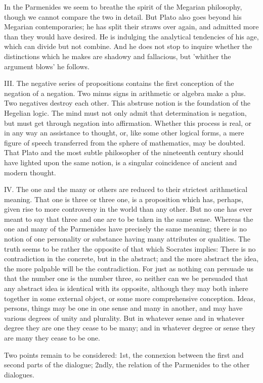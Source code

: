 In the Parmenides we seem to breathe the spirit of the Megarian
philosophy, though we cannot compare the two in detail. But Plato also
goes beyond his Megarian contemporaries; he has split their straws over
again, and admitted more than they would have desired. He is indulging
the analytical tendencies of his age, which can divide but not combine.
And he does not stop to inquire whether the distinctions which he makes
are shadowy and fallacious, but 'whither the argument blows' he follows.

III. The negative series of propositions contains the first conception
of the negation of a negation. Two minus signs in arithmetic or algebra
make a plus. Two negatives destroy each other. This abstruse notion is
the foundation of the Hegelian logic. The mind must not only admit
that determination is negation, but must get through negation into
affirmation. Whether this process is real, or in any way an assistance
to thought, or, like some other logical forms, a mere figure of speech
transferred from the sphere of mathematics, may be doubted. That Plato
and the most subtle philosopher of the nineteenth century should have
lighted upon the same notion, is a singular coincidence of ancient and
modern thought.

IV. The one and the many or others are reduced to their strictest
arithmetical meaning. That one is three or three one, is a proposition
which has, perhaps, given rise to more controversy in the world than
any other. But no one has ever meant to say that three and one are to be
taken in the same sense. Whereas the one and many of the Parmenides have
precisely the same meaning; there is no notion of one personality or
substance having many attributes or qualities. The truth seems to
be rather the opposite of that which Socrates implies: There is no
contradiction in the concrete, but in the abstract; and the more
abstract the idea, the more palpable will be the contradiction. For just
as nothing can persuade us that the number one is the number three, so
neither can we be persuaded that any abstract idea is identical with
its opposite, although they may both inhere together in some external
object, or some more comprehensive conception. Ideas, persons, things
may be one in one sense and many in another, and may have various
degrees of unity and plurality. But in whatever sense and in whatever
degree they are one they cease to be many; and in whatever degree or
sense they are many they cease to be one.

Two points remain to be considered: 1st, the connexion between the first
and second parts of the dialogue; 2ndly, the relation of the Parmenides
to the other dialogues.

